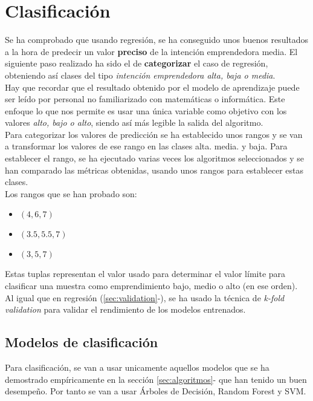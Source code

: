 \chapter{Clasificación}
\label{sec:class}
Se ha comprobado que usando regresión, se ha conseguido unos buenos resultados a la hora de predecir un valor \textbf{preciso} de la intención emprendedora media. El siguiente paso realizado ha sido el de \textbf{categorizar} el caso de regresión, obteniendo así clases del tipo \textit{intención emprendedora alta, baja o media}.\\
Hay que recordar que el resultado obtenido por el modelo de aprendizaje puede ser leído por personal no familiarizado con matemáticas o informática. Este enfoque lo que nos permite es usar una única variable como objetivo con los valores \textit{alto, bajo o alto}, siendo así más legible la salida del algoritmo.\\
\linebreak
Para categorizar los valores de predicción se ha establecido unos rangos y se van a transformar los valores de ese rango en las clases alta. media. y baja. Para establecer el rango, se ha ejecutado varias veces los algoritmos seleccionados y se han comparado las métricas obtenidas, usando unos rangos para establecer estas clases.\\
Los rangos que se han probado son:
\begin{itemize}
	\item $(4, 6, 7)$
	\item $(3.5, 5.5, 7)$
	\item $(3, 5, 7)$
\end{itemize}
Estas tuplas representan el valor usado para determinar el valor límite para clasificar una muestra como emprendimiento bajo, medio o alto (en ese orden).\\
\linebreak
Al igual que en regresión (\ref{sec:validation}-), se ha usado la técnica de \textit{k-fold validation} para validar el rendimiento de los modelos entrenados.
\clearpage
\section{Modelos de clasificación}
Para clasificación, se van a usar unicamente aquellos modelos que se ha demostrado empíricamente en la sección \ref{sec:algoritmos}- que han tenido un buen desempeño. Por tanto se van a usar Árboles de Decisión, Random Forest y SVM.
